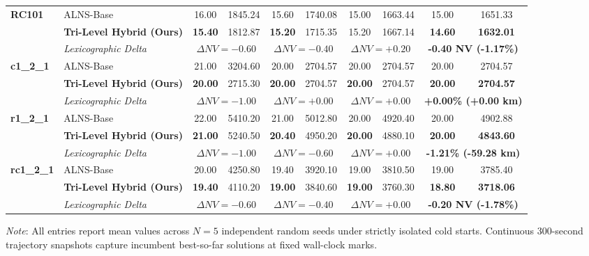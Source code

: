 \documentclass{ieeeaccess}
\begin{document}
\begin{table}[!t]
\begin{tabular*}{\textwidth}{@{\extracolsep{\fill}} ll cccccc cc @{}}
\midrule
\multirow{3}{*}{\textbf{RC101}} & ALNS-Base & 16.00 & 1845.24 & 15.60 & 1740.08 & 15.00 & 1663.44 & 15.00 & 1651.33 \\
 & \textbf{Tri-Level Hybrid (Ours)} & \textbf{15.40} & 1812.87 & \textbf{15.20} & 1715.35 & 15.20 & 1667.14 & \textbf{14.60} & \textbf{1632.01} \\
 & \textit{Lexicographic Delta} & \multicolumn{2}{c}{$\Delta NV = -0.60$} & \multicolumn{2}{c}{$\Delta NV = -0.40$} & \multicolumn{2}{c}{$\Delta NV = +0.20$} & \multicolumn{2}{c}{\textbf{-0.40 NV (-1.17\%)}} \\
\midrule
\multirow{3}{*}{\textbf{c1\_2\_1}} & ALNS-Base & 21.00 & 3204.60 & 20.00 & 2704.57 & 20.00 & 2704.57 & 20.00 & 2704.57 \\
 & \textbf{Tri-Level Hybrid (Ours)} & \textbf{20.00} & 2715.30 & \textbf{20.00} & 2704.57 & \textbf{20.00} & 2704.57 & \textbf{20.00} & \textbf{2704.57} \\
 & \textit{Lexicographic Delta} & \multicolumn{2}{c}{$\Delta NV = -1.00$} & \multicolumn{2}{c}{$\Delta NV = +0.00$} & \multicolumn{2}{c}{$\Delta NV = +0.00$} & \multicolumn{2}{c}{\textbf{+0.00\% (+0.00 km)}} \\
\midrule
\multirow{3}{*}{\textbf{r1\_2\_1}} & ALNS-Base & 22.00 & 5410.20 & 21.00 & 5012.80 & 20.00 & 4920.40 & 20.00 & 4902.88 \\
 & \textbf{Tri-Level Hybrid (Ours)} & \textbf{21.00} & 5240.50 & \textbf{20.40} & 4950.20 & \textbf{20.00} & 4880.10 & \textbf{20.00} & \textbf{4843.60} \\
 & \textit{Lexicographic Delta} & \multicolumn{2}{c}{$\Delta NV = -1.00$} & \multicolumn{2}{c}{$\Delta NV = -0.60$} & \multicolumn{2}{c}{$\Delta NV = +0.00$} & \multicolumn{2}{c}{\textbf{-1.21\% (-59.28 km)}} \\
\midrule
\multirow{3}{*}{\textbf{rc1\_2\_1}} & ALNS-Base & 20.00 & 4250.80 & 19.40 & 3920.10 & 19.00 & 3810.50 & 19.00 & 3785.40 \\
 & \textbf{Tri-Level Hybrid (Ours)} & \textbf{19.40} & 4110.20 & \textbf{19.00} & 3840.60 & \textbf{19.00} & 3760.30 & \textbf{18.80} & \textbf{3718.06} \\
 & \textit{Lexicographic Delta} & \multicolumn{2}{c}{$\Delta NV = -0.60$} & \multicolumn{2}{c}{$\Delta NV = -0.40$} & \multicolumn{2}{c}{$\Delta NV = +0.00$} & \multicolumn{2}{c}{\textbf{-0.20 NV (-1.78\%)}} \\
\bottomrule
\end{tabular*}
{\raggedright \footnotesize \textit{Note}: All entries report mean values across $N=5$ independent random seeds under strictly isolated cold starts. Continuous 300-second trajectory snapshots capture incumbent best-so-far solutions at fixed wall-clock marks.\par}
\end{table}
\end{document}
